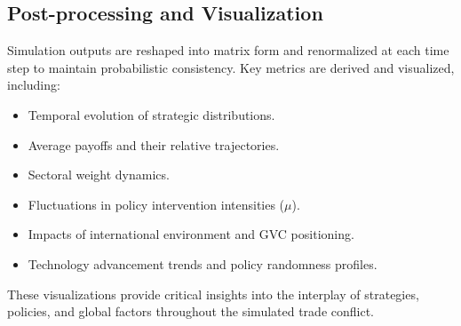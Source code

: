 \documentclass{article}
\begin{document}
\subsection{Post-processing and Visualization}

Simulation outputs are reshaped into matrix form and renormalized at each time step to maintain probabilistic consistency. Key metrics are derived and visualized, including:
\begin{itemize}
    \item Temporal evolution of strategic distributions.
    \item Average payoffs and their relative trajectories.
    \item Sectoral weight dynamics.
    \item Fluctuations in policy intervention intensities (\(\mu\)).
    \item Impacts of international environment and GVC positioning.
    \item Technology advancement trends and policy randomness profiles.
\end{itemize}

These visualizations provide critical insights into the interplay of strategies, policies, and global factors throughout the simulated trade conflict.
\end{document}
